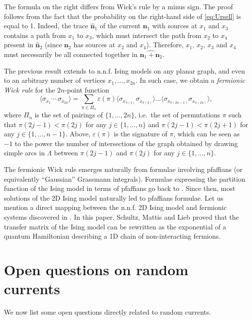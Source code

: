 \documentclass[a4paper,oneside,11pt]{article}
\begin{document}
The formula on the right differs from Wick's rule by a minus sign. The proof follows from the fact that the probability on the right-hand side of \eqref{eq:Ursell} is equal to 1. Indeed, the trace $\widehat{\mathbf n}_1$ of the current $\mathbf n_1$ with sources at $x_1$ and $x_3$ contains a path from $x_1$ to $x_3$, which must intersect the path from $x_2$ to $x_4$ present in $\widehat{\mathbf n}_2$ (since $\mathbf n_2$ has sources at $x_2$ and $x_4$). Therefore, $x_1$, $x_2$, $x_3$ and $x_4$ must necessarily be all connected together in $\widehat{{\mathbf n}_1+{\mathbf n} _2}$. 

The previous result extends to n.n.f. Ising models on any planar graph, and even to an arbitrary number of vertices $x_1,\dots,x_{2n}$. In such case, we obtain a {\em fermionic Wick rule} for the $2n$-point function
$$\langle \sigma_{x_1}\cdots\,\sigma_{x_{2n}}\rangle=\sum_{\pi\in\Pi_n}\varepsilon(\pi)\langle \sigma_{x_{\pi(1)}}\sigma_{x_{\pi(2)}}\rangle\dots \langle \sigma_{x_{\pi(2n-1)}}\sigma_{x_{\pi(2n)}}\rangle,$$
where $\Pi_n$ is the set of pairings of $\{1,\dots,2n\}$, i.e.~the set of permutations $\pi$ such that
$\pi(2j-1)<\pi(2j)$ for any $j\in\{1,\dots,n\}$ and $\pi(2j-1)<\pi(2j+1)$ for any $j\in\{1,\dots,n-1\}$. Above, $\varepsilon(\pi)$ is the signature of $\pi$, which can be seen as $-1$ to the power the number of intersections of the graph obtained by drawing simple arcs in $\Lambda$ between $\pi(2j-1)$ and $\pi(2j)$ for any $j\in\{1,\dots,n\}$. 

The fermionic Wick rule emerges naturally from formulae involving pfaffians (or equivalently ``Gaussian'' Grassmann integrals). Formulae expressing the partition function of the Ising model in terms of pfaffians go back to \cite{Kas63,HurGre60}. Since then, most solutions of the 2D Ising model naturally led to pfaffians formulae. Let us mention 
a direct mapping between the n.n.f. 2D Ising model and fermionic systems discovered in \cite{SchMatLie64}. In this paper, Schultz, Mattis and Lieb proved that the transfer matrix of the Ising model can be rewritten as the exponential of a quantum Hamiltonian describing a 1D chain of non-interacting fermions. 

\section{Open questions on random currents}

We now list some open questions directly related to random currents.
\end{document}
